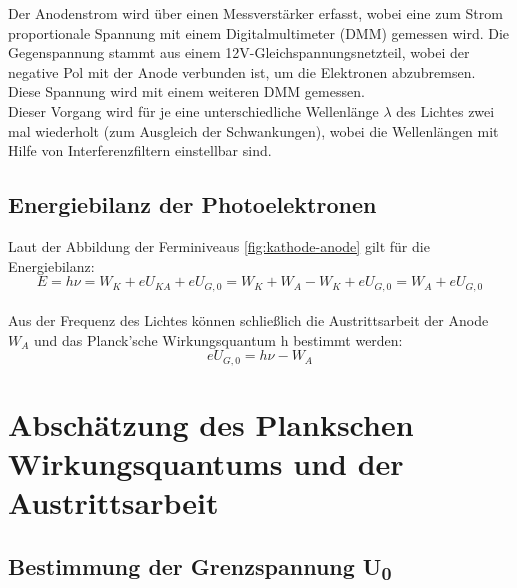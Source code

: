 Der Anodenstrom wird über einen Messverstärker erfasst, 
wobei eine zum Strom proportionale Spannung mit einem 
Digitalmultimeter (DMM) gemessen wird. Die Gegenspannung 
stammt aus einem 12V-Gleichspannungsnetzteil, 
wobei der negative Pol mit der Anode verbunden ist, 
um die Elektronen abzubremsen. Diese Spannung wird 
mit einem weiteren DMM gemessen.\\
Dieser Vorgang wird für je eine unterschiedliche Wellenlänge
$\lambda$ des Lichtes zwei mal wiederholt (zum Ausgleich der Schwankungen), wobei die
Wellenlängen mit Hilfe von Interferenzfiltern
einstellbar sind.


\subsection{Energiebilanz der Photoelektronen}
Laut der Abbildung der Ferminiveaus \ref{fig:kathode-anode} 
gilt für die Energiebilanz:
\begin{equation}
    E = h\nu = W_K + eU_{KA} + eU_{G,0} 
    = W_K + W_A - W_K + eU_{G,0} 
    = W_A + eU_{G,0}
\end{equation}\\
Aus der Frequenz des Lichtes können 
schließlich
die Austrittsarbeit der Anode $W_A$ und 
das Planck’sche Wirkungsquantum h bestimmt 
werden:
\begin{equation}
    eU_{G,0} = h\nu - W_A
\end{equation}
\section{Abschätzung des Plankschen Wirkungsquantums und der Austrittsarbeit}
\subsection[Bestimmung der Grenzspannung U0]{Bestimmung der Grenzspannung U\textsubscript{0}}
